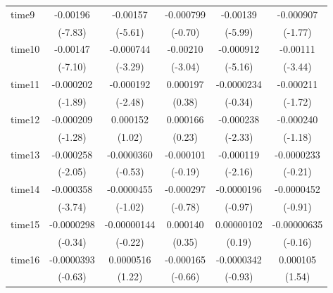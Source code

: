 \begin{table}[htbp]
\begin{tabular}{l*{5}{c}}
time9       &    -0.00196\sym{***}&    -0.00157\sym{***}&   -0.000799         &    -0.00139\sym{***}&   -0.000907         \\
            &     (-7.83)         &     (-5.61)         &     (-0.70)         &     (-5.99)         &     (-1.77)         \\
time10      &    -0.00147\sym{***}&   -0.000744\sym{***}&    -0.00210\sym{**} &   -0.000912\sym{***}&    -0.00111\sym{***}\\
            &     (-7.10)         &     (-3.29)         &     (-3.04)         &     (-5.16)         &     (-3.44)         \\
time11      &   -0.000202         &   -0.000192\sym{*}  &    0.000197         &  -0.0000234         &   -0.000211         \\
            &     (-1.89)         &     (-2.48)         &      (0.38)         &     (-0.34)         &     (-1.72)         \\
time12      &   -0.000209         &    0.000152         &    0.000166         &   -0.000238\sym{*}  &   -0.000240         \\
            &     (-1.28)         &      (1.02)         &      (0.23)         &     (-2.33)         &     (-1.18)         \\
time13      &   -0.000258\sym{*}  &  -0.0000360         &   -0.000101         &   -0.000119\sym{*}  &  -0.0000233         \\
            &     (-2.05)         &     (-0.53)         &     (-0.19)         &     (-2.16)         &     (-0.21)         \\
time14      &   -0.000358\sym{***}&  -0.0000455         &   -0.000297         &  -0.0000196         &  -0.0000452         \\
            &     (-3.74)         &     (-1.02)         &     (-0.78)         &     (-0.97)         &     (-0.91)         \\
time15      &  -0.0000298         & -0.00000144         &    0.000140         &  0.00000102         & -0.00000635         \\
            &     (-0.34)         &     (-0.22)         &      (0.35)         &      (0.19)         &     (-0.16)         \\
time16      &  -0.0000393         &   0.0000516         &   -0.000165         &  -0.0000342         &    0.000105         \\
            &     (-0.63)         &      (1.22)         &     (-0.66)         &     (-0.93)         &      (1.54)         \\

\end{tabular}
\end{table}
